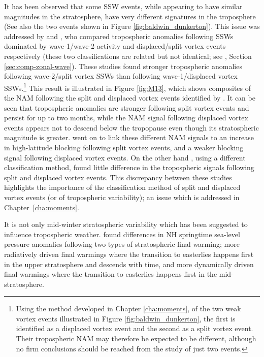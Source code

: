 It has been observed that some SSW events, while appearing to have similar
magnitudes in the stratosphere, have very different signatures in the
troposphere \citep[e.g.,][]{Baldwin2001a,Tomassini2012} (See also the two events
shown in Figure \ref{fig:baldwin_dunkerton}). This issue was addressed by
\citet{Nakagawa2006} and \citet{Mitchell2013}, who compared tropospheric
anomalies following SSWs dominated by wave-1/wave-2 activity and displaced/split
vortex events respectively (these two classifications are related but not
identical; see \citet{Waugh1997}, Section \ref{sec:comp-zonal-wave}). These
studies found stronger tropospheric anomalies following wave-2/split vortex
SSWs than following wave-1/displaced vortex SSWs.\footnote{Using the method
  developed in Chapter \ref{cha:moments}, of the two weak vortex events
  illustrated in Figure \ref{fig:baldwin_dunkerton}, the first is identified as
  a displaced vortex event and the second as a split vortex event. Their
  tropospheric NAM may therefore be expected to be different, although no firm
  conclusions should be reached from the study of just two events.} This result
is illustrated in Figure \ref{fig:M13}, which shows composites of the NAM
following the split and displaced vortex events identified by
\citet{Mitchell2013}. It can be seen that tropospheric anomalies are stronger
following split vortex events and persist for up to two months, while the NAM
signal following displaced vortex events appears not to descend below the
tropopause even though its stratospheric magnitude is
greater. \citet{Mitchell2013} went on to link these different NAM signals to an
increase in high-latitude blocking following split vortex events, and a weaker
blocking signal following displaced vortex events. On the other hand
\citet{Charlton2007}, using a different classification method, found little
difference in the tropospheric signals following split and displaced vortex
events. This discrepancy between these studies highlights the importance of the
classification method of split and displaced vortex events (or of tropospheric
variability); an issue which is addressed in Chapter~\ref{cha:moments}.

It is not only mid-winter stratospheric variability which has been suggested to
influence tropospheric weather. \citet{Hardiman2011} found differences
in NH springtime sea-level pressure anomalies following two types of
stratospheric final warming; more radiatively driven final warmings where the
transition to easterlies happens first in the upper stratosphere and descends
with time, and more dynamically driven final warmings where the transition to
easterlies happens first in the mid-stratosphere.  

